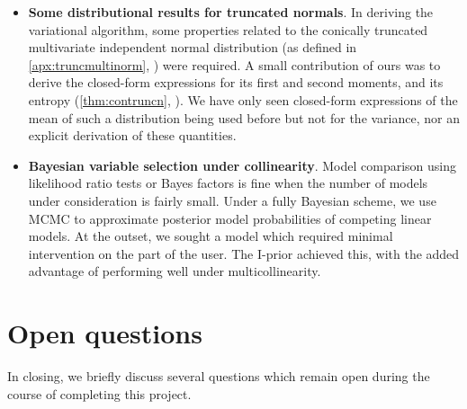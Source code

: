 \documentclass[showframe,11pt,twoside,openright]{report}
\begin{document}
\begin{itemize}
  \item \textbf{Some distributional results for truncated normals}. 
  In deriving the variational algorithm, some properties related to the conically truncated multivariate independent normal distribution (as defined in \cref{apx:truncmultinorm}, ) were required.
  A small contribution of ours was to derive the closed-form expressions for its first and second moments, and its entropy (\cref{thm:contruncn}, ).
  We have only seen closed-form expressions of the mean of such a distribution being used before \citep{girolami2006variational} but not for the variance, nor an explicit derivation of these quantities.
    
  \item \textbf{Bayesian variable selection under collinearity}. 
  Model comparison using likelihood ratio tests or Bayes factors is fine when the number of models under consideration is fairly small.
  Under a fully Bayesian scheme, we use MCMC to approximate posterior model probabilities of competing linear models.
  At the outset, we sought a model which required minimal intervention on the part of the user.
  The I-prior achieved this, with the added advantage of performing well under multicollinearity.
  
\end{itemize}

\section{Open questions}

In closing, we briefly discuss several questions which remain open during the course of completing this project.
\end{document}
